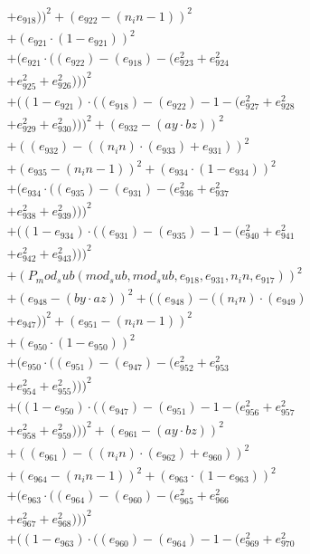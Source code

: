 \documentclass[10pt, a4paper]{article}
\begin{document}
\begin{align*}
& + e_{918}))^{2} + (e_{922} - (n_in - 1))^{2} \\
& + (e_{921}  \cdot  (1 - e_{921}))^{2} \\
& + (e_{921}  \cdot  ((e_{922}) - (e_{918}) - (e_{923}^{2} + e_{924}^{2} \\
& + e_{925}^{2} + e_{926}^{2})))^{2} \\
& + ((1 - e_{921})  \cdot  ((e_{918}) - (e_{922}) - 1 - (e_{927}^{2} + e_{928}^{2} \\
& + e_{929}^{2} + e_{930}^{2})))^{2} + (e_{932} - (ay  \cdot  bz))^{2} \\
& + ((e_{932}) - ((n_in)  \cdot  (e_{933}) + e_{931}))^{2} \\
& + (e_{935} - (n_in - 1))^{2} + (e_{934}  \cdot  (1 - e_{934}))^{2} \\
& + (e_{934}  \cdot  ((e_{935}) - (e_{931}) - (e_{936}^{2} + e_{937}^{2} \\
& + e_{938}^{2} + e_{939}^{2})))^{2} \\
& + ((1 - e_{934})  \cdot  ((e_{931}) - (e_{935}) - 1 - (e_{940}^{2} + e_{941}^{2} \\
& + e_{942}^{2} + e_{943}^{2})))^{2} \\
& + (P_mod_sub(mod_sub, mod_sub, e_{918}, e_{931}, n_in, e_{917}))^{2} \\
& + (e_{948} - (by  \cdot  az))^{2} + ((e_{948}) - ((n_in)  \cdot  (e_{949}) \\
& + e_{947}))^{2} + (e_{951} - (n_in - 1))^{2} \\
& + (e_{950}  \cdot  (1 - e_{950}))^{2} \\
& + (e_{950}  \cdot  ((e_{951}) - (e_{947}) - (e_{952}^{2} + e_{953}^{2} \\
& + e_{954}^{2} + e_{955}^{2})))^{2} \\
& + ((1 - e_{950})  \cdot  ((e_{947}) - (e_{951}) - 1 - (e_{956}^{2} + e_{957}^{2} \\
& + e_{958}^{2} + e_{959}^{2})))^{2} + (e_{961} - (ay  \cdot  bz))^{2} \\
& + ((e_{961}) - ((n_in)  \cdot  (e_{962}) + e_{960}))^{2} \\
& + (e_{964} - (n_in - 1))^{2} + (e_{963}  \cdot  (1 - e_{963}))^{2} \\
& + (e_{963}  \cdot  ((e_{964}) - (e_{960}) - (e_{965}^{2} + e_{966}^{2} \\
& + e_{967}^{2} + e_{968}^{2})))^{2} \\
& + ((1 - e_{963})  \cdot  ((e_{960}) - (e_{964}) - 1 - (e_{969}^{2} + e_{970}^{2} \\

\end{align*}
\end{document}
